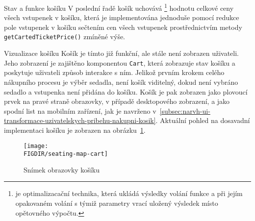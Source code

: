 \begin{subsection}{Stav a funkce košíku}
    V poslední řadě košík uchovává \footnote{ je optimalizacační technika, která ukládá výsledky volání funkce a při jejím opakovaném volání s týmiž parametry vrací uložený výsledek místo opětovného výpočtu.} hodnotu celkové ceny všech vstupenek v košíku, která je implementována jednoduše pomocí redukce pole vstupenek v košíku sečtením cen všech vstupenek prostřednictvím metody \linebreak\texttt{getCartedTicketPrice()} zmíněné výše.
\end{subsection}
\pagebreak

\begin{subsection}{Vizualizace košíku}
    \label{subsec:implementace-kosik-vizualizace}
    Košík je tímto již funkční, ale stále není zobrazen uživateli.
    Jeho zobrazení je zajištěno komponentou \texttt{Cart}, která zobrazuje stav košíku a poskytuje uživateli způsob interakce s ním.
    Jelikož prvním krokem celého nákupního procesu je výběr sedadla, není košík viditelný, dokud není vybráno sedadlo a vstupenka není přidána do košíku.
    Košík je pak zobrazen jako plovoucí prvek na pravé straně obrazovky, v případě desktopového zobrazení, a jako spodní list na mobilním zařízení, jak je navrženo v~\ref{subsec:narvh-ui-transformace-uzivatelskych-pribehu-nakupni-kosik}.
    Aktuální pohled na dosavadní implementaci košíku je zobrazen na obrázku~\ref{fig:seating-map-cart}.

    \begin{figure}[h]
        \centering
        \caption{Snímek obrazovky košíku}
        \texttt{[image: \\FIGDIR/seating-map-cart]}
        \source{}
        \label{fig:seating-map-cart}
    \end{figure}
\end{subsection}
\pagebreak

